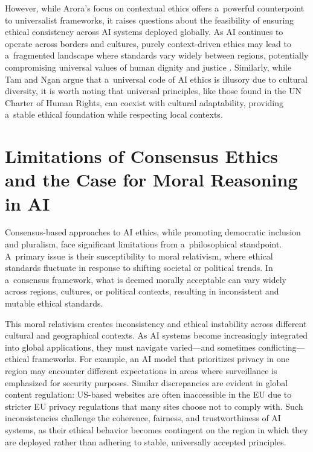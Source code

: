 \documentclass[%
  manuscript=article,
  year=2024,
  volume=77,
  doi=00000.000,
]{zfn}
\begin{document}
However, while Arora's focus on contextual ethics offers a~powerful counterpoint to universalist frameworks, it raises questions about the feasibility of ensuring ethical consistency across AI systems deployed globally. As AI continues to operate across borders and cultures, purely context-driven ethics may lead to a~fragmented landscape where standards vary widely between regions, potentially compromising universal values of human dignity and justice 
\parencite[][]{correa_worldwide_2023}. %
 Similarly, while Tam and Ngan argue that a~universal code of AI ethics is illusory due to cultural diversity, it is worth noting that universal principles, like those found in the UN Charter of Human Rights, can coexist with cultural adaptability, providing a~stable ethical foundation while respecting local contexts.



\section{Limitations of Consensus Ethics and the Case for Moral Reasoning in AI}

Consensus-based approaches to AI ethics, while promoting democratic inclusion and pluralism, face significant limitations from a~philosophical standpoint. A~primary issue is their susceptibility to moral relativism, where ethical standards fluctuate in response to shifting societal or political trends. In a~consensus framework, what is deemed morally acceptable can vary widely across regions, cultures, or political contexts, resulting in inconsistent and mutable ethical standards.



This moral relativism creates inconsistency and ethical instability across different cultural and geographical contexts. As AI systems become increasingly integrated into global applications, they must navigate varied---and sometimes conflicting---ethical frameworks. For example, an AI model that prioritizes privacy in one region may encounter different expectations in areas where surveillance is emphasized for security purposes. Similar discrepancies are evident in global content regulation: US-based websites are often inaccessible in the EU due to stricter EU privacy regulations that many sites choose not to comply with. Such inconsistencies challenge the coherence, fairness, and trustworthiness of AI systems, as their ethical behavior becomes contingent on the region in which they are deployed rather than adhering to stable, universally accepted principles.
\end{document}
